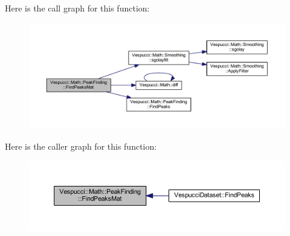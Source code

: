 Here is the call graph for this function\+:
\nopagebreak
\begin{figure}[H]
\begin{center}
\leavevmode
\includegraphics[width=350pt]{namespace_vespucci_1_1_math_1_1_peak_finding_a9f22a184fb69fb6ab32757fdd19e1ae7_cgraph}
\end{center}
\end{figure}




Here is the caller graph for this function\+:
\nopagebreak
\begin{figure}[H]
\begin{center}
\leavevmode
\includegraphics[width=350pt]{namespace_vespucci_1_1_math_1_1_peak_finding_a9f22a184fb69fb6ab32757fdd19e1ae7_icgraph}
\end{center}
\end{figure}


